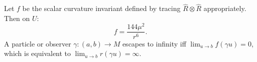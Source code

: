 Let $f$ be the scalar curvature invariant defined by tracing $\hat{R} \otimes \hat{R}$ appropriately. Then on $U$:
$$f = \frac{144\mu^2}{r^6}.$$
A particle or observer $\gamma: (a, b) \to M$ escapes to infinity iff $\lim_{u \to b} f(\gamma u) = 0$, which is equivalent to $\lim_{u \to b} r(\gamma u) = \infty$.
